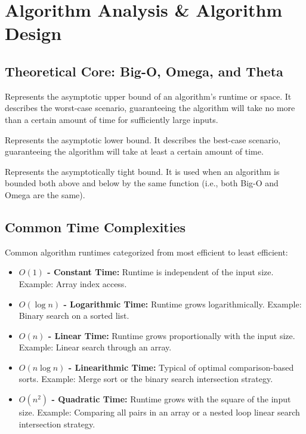 \chapter{Algorithm Analysis \& Algorithm Design}

\section{Theoretical Core: Big-O, Omega, and Theta}

\begin{definition}
Represents the asymptotic upper bound of an algorithm's runtime or space. It describes the worst-case scenario, guaranteeing the algorithm will take no more than a certain amount of time for sufficiently large inputs.
\end{definition}

\begin{definition}
Represents the asymptotic lower bound. It describes the best-case scenario, guaranteeing the algorithm will take at least a certain amount of time.
\end{definition}

\begin{definition}
Represents the asymptotically tight bound. It is used when an algorithm is bounded both above and below by the same function (i.e., both Big-O and Omega are the same).
\end{definition}

\newpage
\section{Common Time Complexities}

\begin{theorem}
Common algorithm runtimes categorized from most efficient to least efficient:
\begin{itemize}
    \item \textbf{$O(1)$ - Constant Time:} Runtime is independent of the input size. Example: Array index access.
    \item \textbf{$O(\log n)$ - Logarithmic Time:} Runtime grows logarithmically. Example: Binary search on a sorted list.
    \item \textbf{$O(n)$ - Linear Time:} Runtime grows proportionally with the input size. Example: Linear search through an array.
    \item \textbf{$O(n \log n)$ - Linearithmic Time:} Typical of optimal comparison-based sorts. Example: Merge sort or the binary search intersection strategy.
    \item \textbf{$O(n^2)$ - Quadratic Time:} Runtime grows with the square of the input size. Example: Comparing all pairs in an array or a nested loop linear search intersection strategy.
\end{itemize}
\end{theorem}


